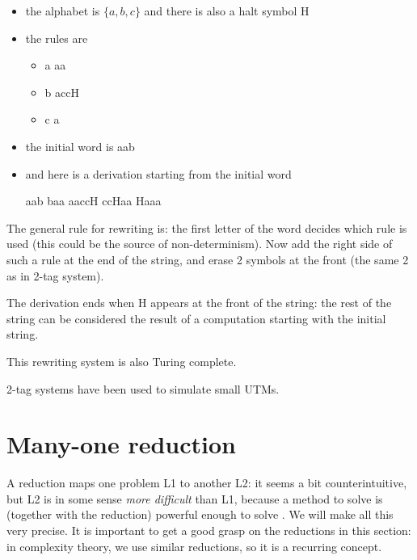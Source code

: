 \begin{itemize}
\item the alphabet is $\{a,b,c\}$ and there is also a halt symbol H
\item the rules are
\begin{itemize}
\item a \rpijl aa
\item b \rpijl accH
\item c \rpijl a
\end{itemize}

\item the initial word is aab
\item and here is a derivation starting from the initial word

aab \rpijl baa \rpijl aaccH \rpijl ccHaa \rpijl Haaa
\end{itemize}

The general rule for rewriting is: the first letter of the word
decides which rule is used (this could be the source of
non-determinism). Now add the right side of such a rule at the end of
the string, and erase 2 symbols at the front (the same 2 as in 2-tag
system).

The derivation ends when H appears at the front of the string: the
rest of the string can be considered the result of a computation
starting with the initial string.

This rewriting system is also Turing complete.


2-tag systems have been used to simulate small UTMs.


\clearpage
\section{Many-one reduction}\label{mappingreduction}

A reduction maps one problem L1 to another L2: it seems a bit counterintuitive, 
but L2 is in some sense {\em more difficult} than L1,
because a method to solve  is (together with the reduction) powerful
enough to solve . We will make all this very precise. It is important
to get a good grasp on the reductions in this section: in complexity
theory, we use similar reductions, so it is a recurring concept.

%

